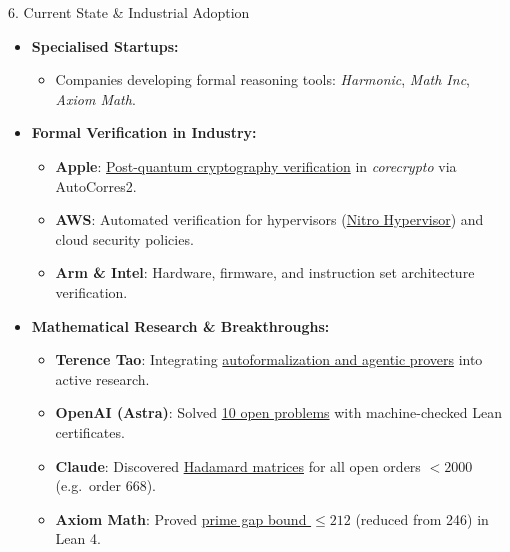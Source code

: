 \documentclass[compress,10pt,xcolor=dvipsnames]{beamer}
\begin{document}
\begin{frame}{6. Current State \& Industrial Adoption}
\begin{itemize}
  \item<1-> \textbf{Specialised Startups:}
    \begin{itemize}
      \item Companies developing formal reasoning tools: \emph{Harmonic}, \emph{Math Inc}, \emph{Axiom Math}.
    \end{itemize}
  \vspace{0.3em}
  \item<2-> \textbf{Formal Verification in Industry:}
    \begin{itemize}
      \item \textbf{Apple}: \href{https://security.apple.com/blog/corecrypto-formal-verification/}{\textcolor{awesome}{Post-quantum cryptography verification}} in \emph{corecrypto} via AutoCorres2.
      \item \textbf{AWS}: Automated verification for hypervisors (\href{https://www.amazon.science/blog/how-formal-verification-makes-aws-nitro-the-first-formally-verified-cloud-hypervisor}{\textcolor{awesome}{Nitro Hypervisor}}) and cloud security policies.
      \item \textbf{Arm \& Intel}: Hardware, firmware, and instruction set architecture verification.
    \end{itemize}
  \vspace{0.3em}
  \item<3-> \textbf{Mathematical Research \& Breakthroughs:}
    \begin{itemize}
      \item \textbf{Terence Tao}: Integrating \href{https://terrytao.wordpress.com/}{\textcolor{awesome}{autoformalization and agentic provers}} into active research.
      \item \textbf{OpenAI (Astra)}: Solved \href{https://github.com/openai/ten-proofs}{\textcolor{awesome}{10 open problems}} with machine-checked Lean certificates.
      \item \textbf{Claude}: Discovered \href{https://oeis.org/A000729}{\textcolor{awesome}{Hadamard matrices}} for all open orders $< 2000$ (e.g.\ order 668).
      \item \textbf{Axiom Math}: Proved \href{https://primegaps.axiommath.ai/}{\textcolor{awesome}{prime gap bound $\le 212$}} (reduced from 246) in Lean 4.
    \end{itemize}
\end{itemize}
\end{frame}
\end{document}
